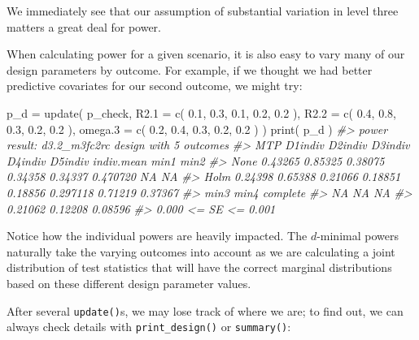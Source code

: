 \documentclass[
]{article}
\newenvironment{Shaded}{\begin{snugshade}}{\end{snugshade}}
\newcommand{\AttributeTok}[1]{\textcolor[rgb]{0.77,0.63,0.00}{#1}}
\newcommand{\CommentTok}[1]{\textcolor[rgb]{0.56,0.35,0.01}{\textit{#1}}}
\newcommand{\FloatTok}[1]{\textcolor[rgb]{0.00,0.00,0.81}{#1}}
\newcommand{\FunctionTok}[1]{\textcolor[rgb]{0.00,0.00,0.00}{#1}}
\newcommand{\NormalTok}[1]{#1}
\newcommand{\OtherTok}[1]{\textcolor[rgb]{0.56,0.35,0.01}{#1}}
\begin{document}
We immediately see that our assumption of substantial variation in level
three matters a great deal for power.

When calculating power for a given scenario, it is also easy to vary
many of our design parameters by outcome. For example, if we thought we
had better predictive covariates for our second outcome, we might try:

\begin{Shaded}
\begin{Highlighting}[]
\NormalTok{p\_d }\OtherTok{=} \FunctionTok{update}\NormalTok{( p\_check,}
            \AttributeTok{R2.1 =} \FunctionTok{c}\NormalTok{( }\FloatTok{0.1}\NormalTok{, }\FloatTok{0.3}\NormalTok{, }\FloatTok{0.1}\NormalTok{, }\FloatTok{0.2}\NormalTok{, }\FloatTok{0.2}\NormalTok{ ),}
            \AttributeTok{R2.2 =} \FunctionTok{c}\NormalTok{( }\FloatTok{0.4}\NormalTok{, }\FloatTok{0.8}\NormalTok{, }\FloatTok{0.3}\NormalTok{, }\FloatTok{0.2}\NormalTok{, }\FloatTok{0.2}\NormalTok{ ),}
            \AttributeTok{omega.3 =} \FunctionTok{c}\NormalTok{( }\FloatTok{0.2}\NormalTok{, }\FloatTok{0.4}\NormalTok{, }\FloatTok{0.3}\NormalTok{, }\FloatTok{0.2}\NormalTok{, }\FloatTok{0.2}\NormalTok{ ) )}
\FunctionTok{print}\NormalTok{( p\_d )}
\CommentTok{\#\textgreater{} power result: d3.2\_m3fc2rc design with 5 outcomes}
\CommentTok{\#\textgreater{}   MTP D1indiv D2indiv D3indiv D4indiv D5indiv indiv.mean    min1    min2}
\CommentTok{\#\textgreater{}  None 0.43265 0.85325 0.38075 0.34358 0.34337   0.470720      NA      NA}
\CommentTok{\#\textgreater{}  Holm 0.24398 0.65388 0.21066 0.18851 0.18856   0.297118 0.71219 0.37367}
\CommentTok{\#\textgreater{}     min3    min4 complete}
\CommentTok{\#\textgreater{}       NA      NA       NA}
\CommentTok{\#\textgreater{}  0.21062 0.12208  0.08596}
\CommentTok{\#\textgreater{}  0.000 \textless{}= SE \textless{}= 0.001}
\end{Highlighting}
\end{Shaded}

Notice how the individual powers are heavily impacted. The \(d\)-minimal
powers naturally take the varying outcomes into account as we are
calculating a joint distribution of test statistics that will have the
correct marginal distributions based on these different design parameter
values.

After several \texttt{update()}s, we may lose track of where we are; to
find out, we can always check details with \texttt{print\_design()} or
\texttt{summary()}:
\end{document}
